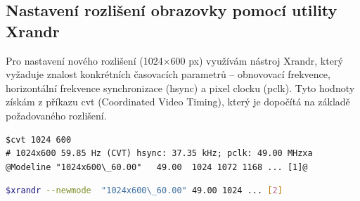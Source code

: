 \subsection{Nastavení rozlišení obrazovky pomocí utility Xrandr}

Pro nastavení nového rozlišení (1024×600 px) využívám nástroj Xrandr, který vyžaduje znalost konkrétních časovacích parametrů – obnovovací frekvence, horizontální frekvence synchronizace (hsync) a pixel clocku (pclk). Tyto hodnoty získám z příkazu cvt (Coordinated Video Timing), který je dopočítá na základě požadovaného rozlišení.


\captionsetup[lstlisting]{labelformat=empty}
\begin{lstlisting}[language=bashcolored, caption=Příklad použití příkazu cvt (Linux terminál):, frame=single, breaklines=true, postbreak=\mbox{\textcolor{gray}{$\hookrightarrow$}\space}]
$cvt 1024 600
# 1024x600 59.85 Hz (CVT) hsync: 37.35 kHz; pclk: 49.00 MHzxa
@Modeline "1024x600\_60.00"   49.00  1024 1072 1168 ... [1]@

\end{lstlisting}
{}

\begin{lstlisting}[language=bash, caption=Na základě nově vygenerovaných parametrů vytvoříme nový režim pomocí Xrandr:, frame=single]
$xrandr --newmode  "1024x600\_60.00" 49.00 1024 ... [2]
\end{lstlisting}

